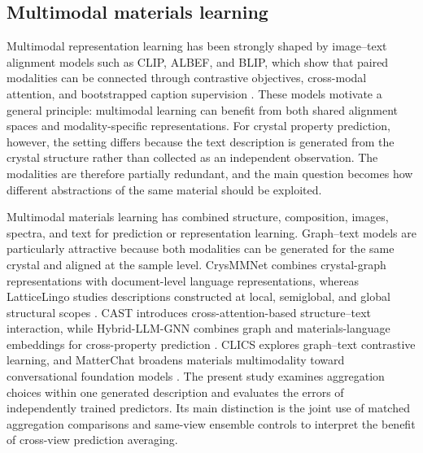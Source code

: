 \documentclass[a4paper,fleqn]{cas-sc}
\begin{document}
\subsection{Multimodal materials learning}
Multimodal representation learning has been strongly shaped by image--text alignment models such as CLIP, ALBEF, and BLIP, which show that paired modalities can be connected through contrastive objectives, cross-modal attention, and bootstrapped caption supervision \citep{radford2021clip,li2021albef,li2022blip}. These models motivate a general principle: multimodal learning can benefit from both shared alignment spaces and modality-specific representations. For crystal property prediction, however, the setting differs because the text description is generated from the crystal structure rather than collected as an independent observation. The modalities are therefore partially redundant, and the main question becomes how different abstractions of the same material should be exploited.

Multimodal materials learning has combined structure, composition, images, spectra, and text for prediction or representation learning. Graph--text models are particularly attractive because both modalities can be generated for the same crystal and aligned at the sample level. CrysMMNet combines crystal-graph representations with document-level language representations, whereas LatticeLingo studies descriptions constructed at local, semiglobal, and global structural scopes \citep{das2023crysmmnet,munjal2024latticelingo}. CAST introduces cross-attention-based structure--text interaction, while Hybrid-LLM-GNN combines graph and materials-language embeddings for cross-property prediction \citep{lee2025cast,li2025hybridllmgnn}. CLICS explores graph--text contrastive learning, and MatterChat broadens materials multimodality toward conversational foundation models \citep{ozawa2024clics,tang2025matterchat}. The present study examines aggregation choices within one generated description and evaluates the errors of independently trained predictors. Its main distinction is the joint use of matched aggregation comparisons and same-view ensemble controls to interpret the benefit of cross-view prediction averaging.
\end{document}
